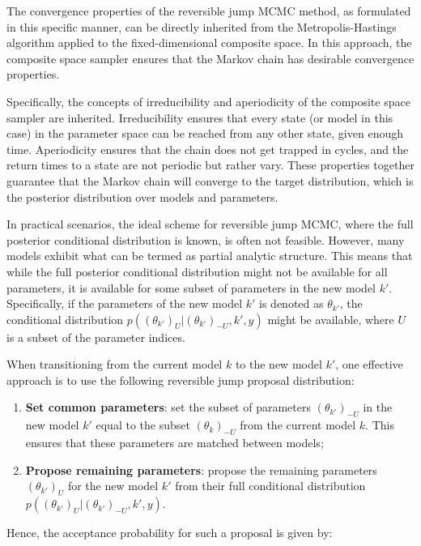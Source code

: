 \documentclass{report}
\begin{document}
The convergence properties of the reversible jump MCMC method, as formulated in this specific manner, can be directly inherited from the Metropolis-Hastings algorithm applied to the fixed-dimensional composite space. In this approach, the composite space sampler ensures that the Markov chain has desirable convergence properties.

Specifically, the concepts of irreducibility and aperiodicity of the composite space sampler are inherited. Irreducibility ensures that every state (or model in this case) in the parameter space can be reached from any other state, given enough time. Aperiodicity ensures that the chain does not get trapped in cycles, and the return times to a state are not periodic but rather vary. These properties together guarantee that the Markov chain will converge to the target distribution, which is the posterior distribution over models and parameters. 

In practical scenarios, the ideal scheme for reversible jump MCMC, where the full posterior conditional distribution is known, is often not feasible. However, many models exhibit what can be termed as partial analytic structure. This means that while the full posterior conditional distribution might not be available for all parameters, it is available for some subset of parameters in the new model $k'$. Specifically, if the parameters of the new model $k'$ is denoted as $\theta_{k'}$, the conditional distribution $p((\theta_{k'})_U | (\theta_{k'})_{-U},k',y)$ might be available, where $U$ is a subset of the parameter indices.  \hfill \break

When transitioning from the current model $k$ to the new model $k'$, one effective approach is to use the following reversible jump proposal distribution:
\begin{enumerate}
	\item \textbf{Set common parameters}: set the subset of parameters $(\theta_{k'})_{-U}$ in the new model $k'$ equal to the subset $(\theta_{k})_{-U}$ from the current model $k$. This ensures that these parameters are matched between models;
	\item \textbf{Propose remaining parameters}: propose the remaining parameters $(\theta_{k'})_{U}$ for the new model $k'$ from their full conditional distribution $p((\theta_{k'})_{U} | (\theta_{k'})_{-U},k',y)$. \hfill 
\end{enumerate}

Hence, the acceptance probability for such a proposal is given by:
\end{document}
